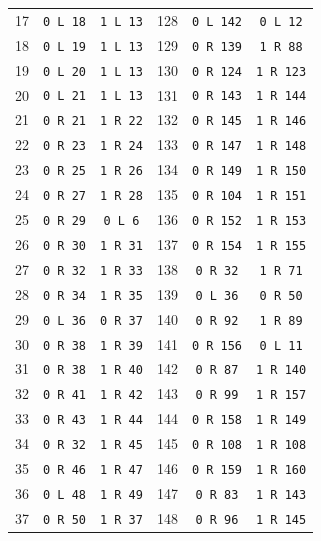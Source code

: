 \begin{longtable}{@{}rcc@{\hspace{14mm}}rcc@{}}
17 & \texttt{0 L 18} & \texttt{1 L 13} & 128 & \texttt{0 L 142} & \texttt{0 L 12}\\
18 & \texttt{0 L 19} & \texttt{1 L 13} & 129 & \texttt{0 R 139} & \texttt{1 R 88}\\
19 & \texttt{0 L 20} & \texttt{1 L 13} & 130 & \texttt{0 R 124} & \texttt{1 R 123}\\
20 & \texttt{0 L 21} & \texttt{1 L 13} & 131 & \texttt{0 R 143} & \texttt{1 R 144}\\
21 & \texttt{0 R 21} & \texttt{1 R 22} & 132 & \texttt{0 R 145} & \texttt{1 R 146}\\
22 & \texttt{0 R 23} & \texttt{1 R 24} & 133 & \texttt{0 R 147} & \texttt{1 R 148}\\
23 & \texttt{0 R 25} & \texttt{1 R 26} & 134 & \texttt{0 R 149} & \texttt{1 R 150}\\
24 & \texttt{0 R 27} & \texttt{1 R 28} & 135 & \texttt{0 R 104} & \texttt{1 R 151}\\
25 & \texttt{0 R 29} & \texttt{0 L 6} & 136 & \texttt{0 R 152} & \texttt{1 R 153}\\
26 & \texttt{0 R 30} & \texttt{1 R 31} & 137 & \texttt{0 R 154} & \texttt{1 R 155}\\
27 & \texttt{0 R 32} & \texttt{1 R 33} & 138 & \texttt{0 R 32} & \texttt{1 R 71}\\
28 & \texttt{0 R 34} & \texttt{1 R 35} & 139 & \texttt{0 L 36} & \texttt{0 R 50}\\
29 & \texttt{0 L 36} & \texttt{0 R 37} & 140 & \texttt{0 R 92} & \texttt{1 R 89}\\
30 & \texttt{0 R 38} & \texttt{1 R 39} & 141 & \texttt{0 R 156} & \texttt{0 L 11}\\
31 & \texttt{0 R 38} & \texttt{1 R 40} & 142 & \texttt{0 R 87} & \texttt{1 R 140}\\
32 & \texttt{0 R 41} & \texttt{1 R 42} & 143 & \texttt{0 R 99} & \texttt{1 R 157}\\
33 & \texttt{0 R 43} & \texttt{1 R 44} & 144 & \texttt{0 R 158} & \texttt{1 R 149}\\
34 & \texttt{0 R 32} & \texttt{1 R 45} & 145 & \texttt{0 R 108} & \texttt{1 R 108}\\
35 & \texttt{0 R 46} & \texttt{1 R 47} & 146 & \texttt{0 R 159} & \texttt{1 R 160}\\
36 & \texttt{0 L 48} & \texttt{1 R 49} & 147 & \texttt{0 R 83} & \texttt{1 R 143}\\
37 & \texttt{0 R 50} & \texttt{1 R 37} & 148 & \texttt{0 R 96} & \texttt{1 R 145}\\

\end{longtable}
